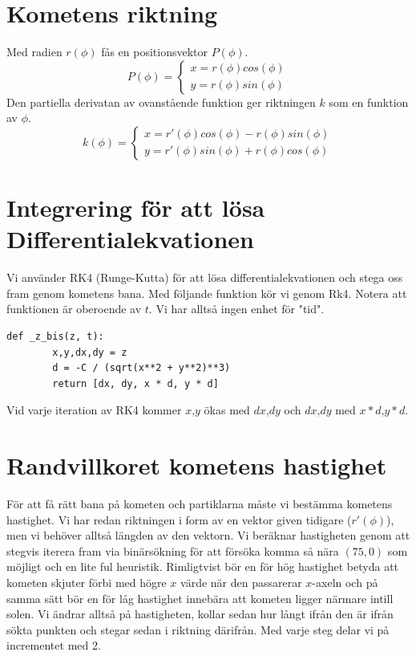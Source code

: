 \documentclass[11pt,twoside]{article}
\begin{document}
\section{Kometens riktning}	
Med radien $r(\phi)$ fås en positionsvektor $P(\phi)$.
\begin{equation}
	P(\phi) = \begin{cases}
	x = r(\phi) cos(\phi) \\
	y = r(\phi) sin(\phi)
	\end{cases}
\end{equation}
Den partiella derivatan av ovanstående funktion ger riktningen $k$ som en funktion av $\phi$. 
\begin{equation}
	k(\phi) = \begin{cases}
	x = r'(\phi) cos(\phi) - r(\phi) sin(\phi) \\
	y = r'(\phi) sin(\phi) + r(\phi) cos(\phi)
	\end{cases}
\end{equation}

\section{Integrering för att lösa Differentialekvationen}
Vi använder RK4 (Runge-Kutta) för att lösa differentialekvationen och stega oss fram genom kometens bana. Med följande funktion kör vi genom Rk4. Notera att funktionen är oberoende av $t$. 
Vi har alltså ingen enhet för "tid".

\begin{lstlisting}
def _z_bis(z, t):
		x,y,dx,dy = z				
		d = -C / (sqrt(x**2 + y**2)**3)
		return [dx, dy, x * d, y * d]
\end{lstlisting}

Vid varje iteration av RK4 kommer $x$,$y$ ökas med $dx$,$dy$ och $dx$,$dy$ med $x*d$,$y*d$.

\section{Randvillkoret kometens hastighet}
För att få rätt bana på kometen och partiklarna måste vi bestämma kometens hastighet. Vi har redan riktningen i form av en vektor given tidigare ($r'(\phi)$), men vi behöver alltså längden av den vektorn.
Vi beräknar hastigheten genom att stegvis iterera fram via binärsökning för att försöka komma så nära $(75,0)$ som möjligt och en lite ful heuristik. Rimligtvist bör en för hög hastighet betyda att kometen skjuter förbi med högre $x$ värde när den passarerar $x$-axeln och på samma sätt bör en för låg hastighet innebära att kometen ligger närmare intill solen.
Vi ändrar alltså på hastigheten, kollar sedan hur långt ifrån den är ifrån sökta punkten och stegar sedan i riktning därifrån. Med varje steg delar vi på incrementet med 2. 
\end{document}
